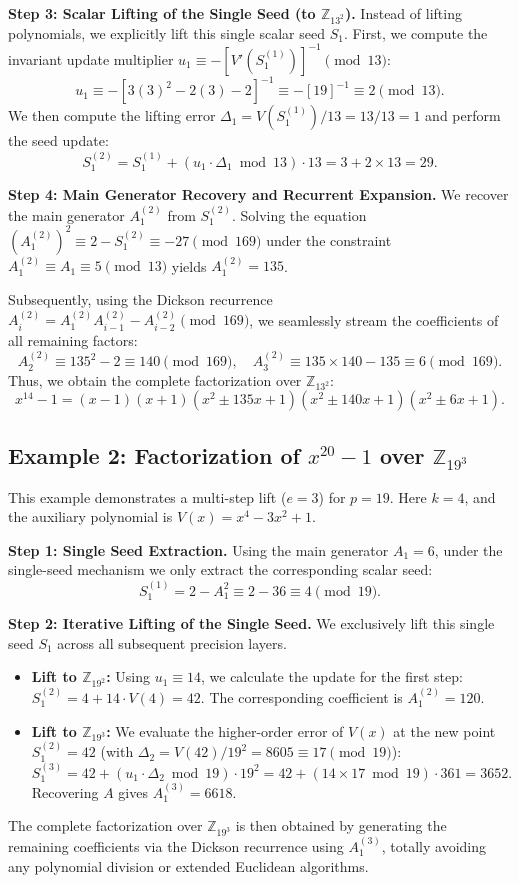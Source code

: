 \documentclass[12pt]{article}
\theoremstyle{plain}
\numberwithin{equation}{section}
\begin{document}
\noindent \textbf{Step 3: Scalar Lifting of the Single Seed (to $\mathbb{Z}_{13^2}$).}
Instead of lifting polynomials, we explicitly lift this single scalar seed $S_1$. First, we compute the invariant update multiplier $u_1 \equiv -[V'(S_1^{(1)})]^{-1} \pmod{13}$:
\[
u_1 \equiv -[3(3)^2 - 2(3) - 2]^{-1} \equiv -[19]^{-1} \equiv 2 \pmod{13}.
\]
We then compute the lifting error $\Delta_1 = V(S_1^{(1)}) / 13 = 13 / 13 = 1$ and perform the seed update:
\[
S_1^{(2)} = S_1^{(1)} + (u_1 \cdot \Delta_1 \bmod 13) \cdot 13 = 3 + 2 \times 13 = 29.
\]

\noindent \textbf{Step 4: Main Generator Recovery and Recurrent Expansion.}
We recover the main generator $A_1^{(2)}$ from $S_1^{(2)}$. Solving the equation $(A_1^{(2)})^2 \equiv 2 - S_1^{(2)} \equiv -27 \pmod{169}$ under the constraint $A_1^{(2)} \equiv A_1 \equiv 5 \pmod{13}$ yields $A_1^{(2)} = 135$.

Subsequently, using the Dickson recurrence $A_i^{(2)} = A_1^{(2)} A_{i-1}^{(2)} - A_{i-2}^{(2)} \pmod{169}$, we seamlessly stream the coefficients of all remaining factors:
\[
A_2^{(2)} \equiv 135^2 - 2 \equiv 140 \pmod{169}, \quad A_3^{(2)} \equiv 135 \times 140 - 135 \equiv 6 \pmod{169}.
\]
Thus, we obtain the complete factorization over $\mathbb{Z}_{13^2}$:
\[
x^{14}-1 = (x-1)(x+1)(x^2 \pm 135x + 1)(x^2 \pm 140x + 1)(x^2 \pm 6x + 1).
\]

\subsection{Example 2: Factorization of $x^{20}-1$ over $\mathbb{Z}_{19^3}$}

This example demonstrates a multi-step lift ($e=3$) for $p=19$.
Here $k=4$, and the auxiliary polynomial is $V(x) = x^4 - 3x^2 + 1$.

\noindent \textbf{Step 1: Single Seed Extraction.}
Using the main generator $A_1 = 6$, under the single-seed mechanism we only extract the corresponding scalar seed:
\[
S_1^{(1)} = 2 - A_1^2 \equiv 2 - 36 \equiv 4 \pmod{19}.
\]

\noindent \textbf{Step 2: Iterative Lifting of the Single Seed.}
We exclusively lift this single seed $S_1$ across all subsequent precision layers.
\begin{itemize}
    \item \textbf{Lift to $\mathbb{Z}_{19^2}$:}
    Using $u_1 \equiv 14$, we calculate the update for the first step: $S_1^{(2)} = 4 + 14 \cdot V(4) = 42$.
    The corresponding coefficient is $A_1^{(2)} = 120$.
    \item \textbf{Lift to $\mathbb{Z}_{19^3}$:}
    We evaluate the higher-order error of $V(x)$ at the new point $S_1^{(2)} = 42$ (with $\Delta_2 = V(42) / 19^2 = 8605 \equiv 17 \pmod{19}$):
    \[
    S_1^{(3)} = 42 + (u_1 \cdot \Delta_2 \bmod 19) \cdot 19^2 = 42 + (14 \times 17 \bmod 19) \cdot 361 = 3652.
    \]
    Recovering $A$ gives $A_1^{(3)} = 6618$.
\end{itemize}
The complete factorization over $\mathbb{Z}_{19^3}$ is then obtained by generating the remaining coefficients via the Dickson recurrence using $A_1^{(3)}$, totally avoiding any polynomial division or extended Euclidean algorithms.
\end{document}
